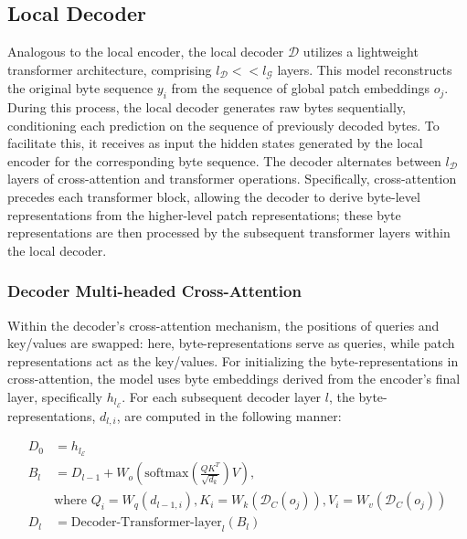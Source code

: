 \subsection{Local Decoder} 

Analogous to the local encoder, the local decoder $\mathcal{D}$ utilizes a lightweight transformer architecture, comprising $l_{\mathcal{D}} << l_{\mathcal{G}}$ layers. This model reconstructs the original byte sequence $y_i$ from the sequence of global patch embeddings $o_j$. During this process, the local decoder generates raw bytes sequentially, conditioning each prediction on the sequence of previously decoded bytes. To facilitate this, it receives as input the hidden states generated by the local encoder for the corresponding byte sequence. The decoder alternates between $l_{\mathcal{D}}$ layers of cross-attention and transformer operations. Specifically, cross-attention precedes each transformer block, allowing the decoder to derive byte-level representations from the higher-level patch representations; these byte representations are then processed by the subsequent transformer layers within the local decoder.

\subsubsection{Decoder Multi-headed Cross-Attention} 

Within the decoder's cross-attention mechanism, the positions of queries and key/values are swapped: here, byte-representations serve as queries, while patch representations act as the key/values. For initializing the byte-representations in cross-attention, the model uses byte embeddings derived from the encoder’s final layer, specifically $h_{l_{\mathcal{E}}}$. For each subsequent decoder layer $l$, the byte-representations, $d_{l,i}$, are computed in the following manner:

\begin{align}
D_0 &= h_{l_{\mathcal{E}}} \\
B_l &= D_{l-1} + W_o\left(\text{softmax}\left(\frac{QK^T}{\sqrt{d_k}}\right)V\right), \\
  &\text{where } Q_i = W_q(d_{l-1,i}), K_i = W_k(\mathcal{D}_C(o_j)), V_i = W_v(\mathcal{D}_C(o_j)) \\
  D_l &= \text{Decoder-Transformer-layer}_l(B_l)
\end{align}

